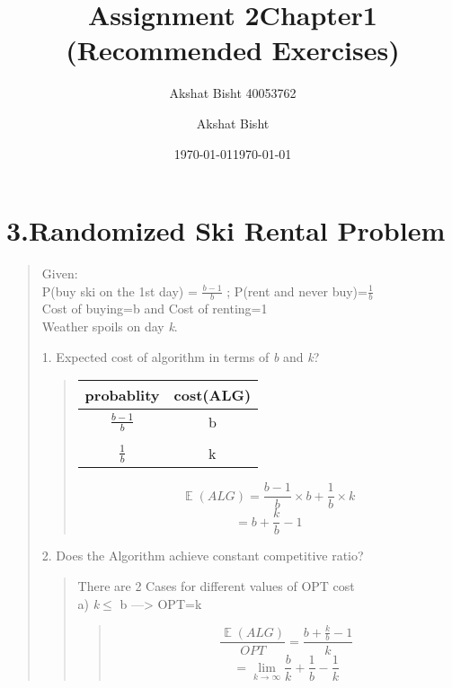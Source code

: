 \documentclass{article}
\title{Assignment 2}
\author{Akshat Bisht 40053762}
\date{\today}
\newenvironment{subs}
  {\adjustwidth{3em}{0pt}}
  {\endadjustwidth}
\begin{document}
\title{Chapter1 (Recommended Exercises)}
\author{Akshat Bisht}
\date{\today}

\maketitle

\section*{ 3.Randomized Ski Rental Problem } 
	\begin{quote}
		Given: \\
		P(buy ski on the 1st day) = $\frac{b-1}{b}$ ;  P(rent and never buy)=$\frac{1}{b} $\\
		Cost of buying=b and Cost of renting=1\\
		Weather spoils on day \textit{k}.
		
		1. Expected cost of algorithm in terms of \textit{b} and \textit{k}?\\
		\begin{quote}
			
			\begin{center}
				\begin{tabular}{ | c | c| }
					\hline
	 					probablity  &  cost(ALG) \\
	 					\hline 
	 					$\frac{b-1}{b}$  & b\\  
						 & \\
			 			$\frac{1}{b}$     & k \\
			 			
			 	
				
			 	
			 		\hline 
			 

			 
				\end{tabular}
			\end{center}
			
			$$\mathop{\mathbb{E}}(ALG)=\frac{b-1}{b} \times b + \frac{1}{b} \times k $$
			$$ = b +\frac{k}{b}-1$$
		\end{quote}
		
		2. Does the Algorithm achieve constant competitive ratio?\\
		\begin{quote}
			There are 2 Cases for different values of OPT cost\\
				a) \textit{k}$\leq$ b ---> OPT=k\\ 
					\begin{quote}
						$$\frac{\mathop{\mathbb{E}}(ALG)}{OPT}=\frac{b+\frac{k}{b}-1}{k}$$
						$$=\lim_{k \to \infty } \frac{b}{k} + \frac{1}{b} - \frac{1}{k}$$
						

\end{quote}
\end{quote}
\end{quote}
\end{document}
